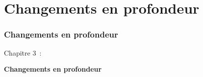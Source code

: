 %

\section{Changements en profondeur}
\begin{frame}[fragile]
	\frametitle{Changements en profondeur}

	\begin{center}\huge{Chapitre 3~:}\end{center}
	\begin{center}\huge{\color{typo3darkgrey}\textbf{Changements en profondeur}}\end{center}

\end{frame}


